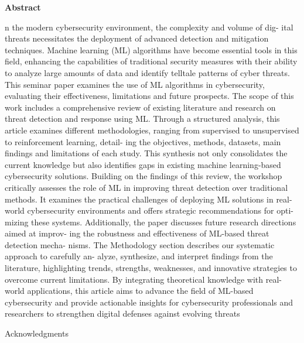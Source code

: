 \documentclass[oneside,a4paper,12pt]{report}
\begin{document}
\newpage
\begin{center}
    {\LARGE \textbf{Abstract}} \\
\end{center}
\justifying
\noindent
n the modern cybersecurity environment, the complexity and volume of dig-
ital threats necessitates the deployment of advanced detection and mitigation
techniques. Machine learning (ML) algorithms have become essential tools
in this field, enhancing the capabilities of traditional security measures with
their ability to analyze large amounts of data and identify telltale patterns
of cyber  threats.
\newline
This seminar paper examines the use of ML algorithms in cybersecurity,
evaluating their effectiveness, limitations and future prospects.
The scope of this work includes a comprehensive review of existing literature
and research on threat detection and response using ML.
Through a structured analysis, this article examines different methodologies,
ranging from supervised to unsupervised to reinforcement learning, detail-
ing the objectives, methods, datasets, main findings and limitations of each
study.
\newline
This synthesis not only consolidates the current knowledge but also identifies
gaps in existing machine learning-based cybersecurity solutions.
Building on the findings of this review, the workshop critically assesses the
role of ML in improving threat detection over traditional methods.
It examines the practical challenges of deploying ML solutions in real-world
cybersecurity environments and offers strategic recommendations for opti-
mizing these systems.
\newline
Additionally, the paper discusses future research directions aimed at improv-
ing the robustness and effectiveness of ML-based threat detection mecha-
nisms.
\newline
The Methodology section describes our systematic approach to carefully an-
alyze, synthesize, and interpret findings from the literature, highlighting
trends, strengths, weaknesses, and innovative strategies to overcome current
limitations.
\newline
By integrating theoretical knowledge with real-world applications, this article
aims to advance the field of ML-based cybersecurity and provide actionable
insights for cybersecurity professionals and researchers to strengthen digital
defenses against evolving threats



\vspace*{4\baselineskip} 
\newpage
{\bfseries \fontsize{14}{12} \selectfont \centerline{Acknowledgments} 
\vspace*{1\baselineskip}}
\setlength{\parindent}{0mm}
\vspace*{1.5\baselineskip}
\end{document}
